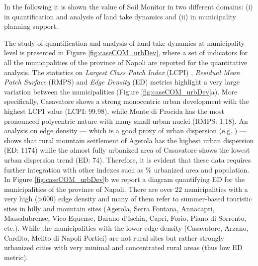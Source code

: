 \documentclass[APA,LATO1COL,doublespace]{WileyNJD-v2}
\begin{document}
In the following it is shown the value of Soil Monitor in two different domains: (i) in quantification and analysis of land take dynamics and (ii) in municipality planning support. 

The study of quantification and analysis of land take dynamics at municipality level is presented in Figure \ref{fig:caseCOM_urbDev}, where a set of indicators for all the municipalities of the province of Napoli are reported for the quantitative analysis.
The statistics on \textit{Largest Class Patch Index} (LCPI) , \textit{Residual Mean Patch Surface} (RMPS) and \textit{Edge Density} (ED) metrics highlight a very large variation between the municipalities (Figure \ref{fig:caseCOM_urbDev}a).
More specifically, Casavatore shows a strong monocentric urban development with the highest LCPI value (LCPI: 99.98), while Monte di Procida has the most pronounced
polycentric nature with many small urban nuclei (RMPS: 1.18).
An analysis on edge density --- which is a good proxy of urban dispersion (e.g. \citealp{SCHWARZ2010}) --- shows that rural mountain settlement of Agerola has the highest urban dispersion (ED: 1174) while the almost fully urbanized area of Casavatore shows the lowest urban dispersion trend (ED: 74).
Therefore, it is evident that these data requires further integration with other indexes such as \% urbanized area and population.
In Figure \ref{fig:caseCOM_urbDev}b we report a diagram quantifying ED for the municipalities of the province of Napoli.
There are over 22 municipalities with a very high (>600) edge density and many of them refer to summer-based touristic sites in hilly and mountain sites (Agerola, Serra Fontana, Annacapri, Massalubrense, Vico Equense, Barano d’Ischia, Capri, Forio, Piano di Sorrento, etc.).
While the municipalities with the lower edge density (Casavatore, Arzano, Cardito, Melito di Napoli Portici) are not rural sites but rather strongly urbanized cities with very minimal and concentrated rural areas (thus low ED metric).
\end{document}
